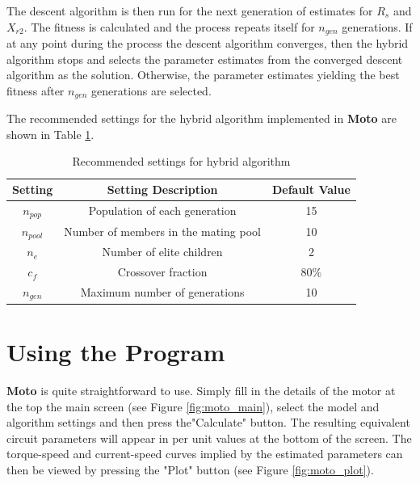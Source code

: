 \documentclass{article}
\begin{document}
The descent algorithm is then run for the next generation of estimates for $R_s$ and $X_{r2}$. The fitness is calculated and the process repeats itself for $n_{gen}$ generations. If at any point during the process the descent algorithm converges, then the hybrid algorithm stops and selects the parameter estimates from the converged descent algorithm as the solution. Otherwise, the parameter estimates yielding the best fitness after $n_{gen}$ generations are selected.

The recommended settings for the hybrid algorithm implemented in \textbf{Moto} are shown in Table \ref{tab:hybrid_default}. 

\begin{table}[htp]
	\renewcommand{\arraystretch}{1.3}
	\begin{center}
	\begin{tabular}{|c|c|c|}
        \hline
        Setting  	& Setting Description  & Default Value	\\ \hline
        $n_{pop}$  	& Population of each generation  & 15	\\ \hline
        $n_{pool}$  	& Number of members in the mating pool  & 10 \\ \hline
        $n_{e}$  	& Number of elite children  & 2	\\ \hline
        $c_{f}$  	& Crossover fraction  & 80\%	\\ \hline
        $n_{gen}$  	& Maximum number of generations  & 10	\\ \hline
    \end{tabular}
	\caption{Recommended settings for hybrid algorithm}
	\label{tab:hybrid_default}
	\end{center}
\end{table}

\newpage
\section{Using the Program}
\textbf{Moto} is quite straightforward to use. Simply fill in the details of the motor at the top the main screen (see Figure \ref{fig:moto_main}), select the model and algorithm settings and then press the"Calculate" button. The resulting equivalent circuit parameters will appear in per unit values at the bottom of the screen. The torque-speed and current-speed curves implied by the estimated parameters can then be viewed by pressing the "Plot" button (see Figure \ref{fig:moto_plot}).
\end{document}
